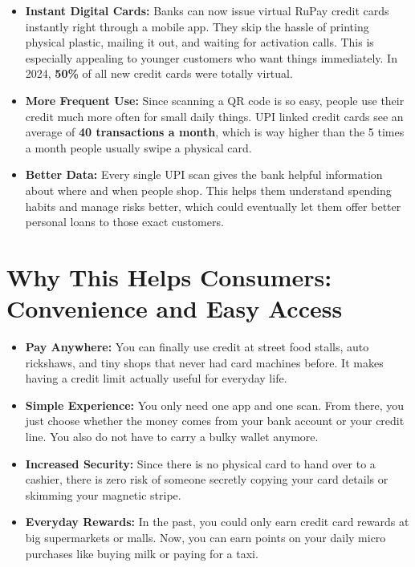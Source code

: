 \begin{itemize}
    \item \textbf{Instant Digital Cards:} Banks can now issue virtual RuPay credit cards instantly right through a mobile app. They skip the hassle of printing physical plastic, mailing it out, and waiting for activation calls. This is especially appealing to younger customers who want things immediately. In 2024, \textbf{50\%} of all new credit cards were totally virtual.
    \item \textbf{More Frequent Use:} Since scanning a QR code is so easy, people use their credit much more often for small daily things. UPI linked credit cards see an average of \textbf{40 transactions a month}, which is way higher than the 5 times a month people usually swipe a physical card.
    \item \textbf{Better Data:} Every single UPI scan gives the bank helpful information about where and when people shop. This helps them understand spending habits and manage risks better, which could eventually let them offer better personal loans to those exact customers.
\end{itemize}

\section{Why This Helps Consumers: Convenience and Easy Access}

\begin{itemize}
    \item \textbf{Pay Anywhere:} You can finally use credit at street food stalls, auto rickshaws, and tiny shops that never had card machines before. It makes having a credit limit actually useful for everyday life.
    \item \textbf{Simple Experience:} You only need one app and one scan. From there, you just choose whether the money comes from your bank account or your credit line. You also do not have to carry a bulky wallet anymore.
    \item \textbf{Increased Security:} Since there is no physical card to hand over to a cashier, there is zero risk of someone secretly copying your card details or skimming your magnetic stripe.
    \item \textbf{Everyday Rewards:} In the past, you could only earn credit card rewards at big supermarkets or malls. Now, you can earn points on your daily micro purchases like buying milk or paying for a taxi.
\end{itemize}

